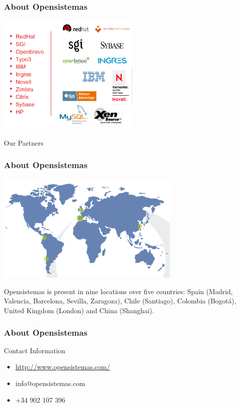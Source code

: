 \documentclass{beamer}
\begin{document}
\begin{frame}
\frametitle{About Opensistemas}
\begin{center}
\includegraphics[width=7cm]{figs/opensistemas-partners}
\end{center}
\begin{center}
Our Partners
\end{center}
\end{frame}

\begin{frame}

\frametitle{About Opensistemas}
\begin{center}
\includegraphics[width=9cm]{figs/opensistemas-worldmap}
\end{center}
\begin{center}
{\small Opensistemas is present in nine locations over five countries: Spain (Madrid, Valencia, Barcelona, Sevilla, Zaragoza), Chile (Santiago), Colombia (Bogotá), United Kingdom (London) and China (Shanghai).}
\end{center}
\end{frame}

\begin{frame}

\frametitle{About Opensistemas}
{\Huge Contact Information}
\begin{itemize}
\item \textcolor{blue}{\url{http://www.opensistemas.com/}}
\item info@opensistemas.com
\item +34 902 107 396
\end{itemize}
\end{frame}
\end{document}
